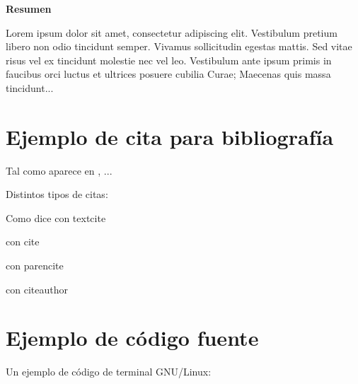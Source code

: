 \documentclass{\ClassPath/viu-tfm-template}
\begin{document}
    \coverpage




    \vspace*{\fill}
    \begin{center}
        \textbf{Resumen}
    \end{center}

    Lorem ipsum dolor sit amet, consectetur adipiscing elit. Vestibulum pretium libero non odio tincidunt semper. Vivamus sollicitudin egestas mattis. Sed vitae risus vel ex tincidunt molestie nec vel leo. Vestibulum ante ipsum primis in faucibus orci luctus et ultrices posuere cubilia Curae; Maecenas quis massa tincidunt...


    \vspace*{\fill}
    \vspace*{\fill}
    \vspace*{\fill}

    \pagebreak


    \tableofcontents

    \chapter{Ejemplo de cita para bibliografía}
    Tal como aparece en \textcite{einstein}, ...

    Distintos tipos de citas:

    Como dice \textcite{Xanthopoulos} con textcite

    \cite{Xanthopoulos}  con cite

    \parencite{Xanthopoulos} con parencite

    \citeauthor{Xanthopoulos} con citeauthor

    \chapter{Ejemplo de código fuente}
    Un ejemplo de código de terminal GNU/Linux:
\end{document}
